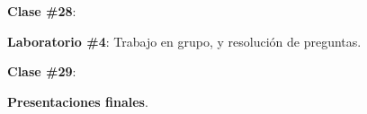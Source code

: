 \documentclass[letterpaper]{article}
\renewenvironment{itemize}{
  \begin{list}{}{
    \setlength{\leftmargin}{1.5em}
  }
}{
  \end{list}
}
\begin{document}
\begin{enumerate}
      \begin{itemize} 
        \item[$\bullet$] {\bf Clase \#28}:
          \begin{itemize} 
            \item[$\circ$] {\bf Laboratorio \#4}: Trabajo en grupo, y resoluci\'on de preguntas.
          \end{itemize}
      \end{itemize}



            \begin{itemize} 
        \item[$\bullet$] {\bf Clase \#29}:
          \begin{itemize} 
            \item[$\circ$] {\bf Presentaciones finales}.
          \end{itemize}
      \end{itemize}






			


			

\end{enumerate}


\newpage
{}
\setcounter{page}{1}
\printbibliography
\end{document}
